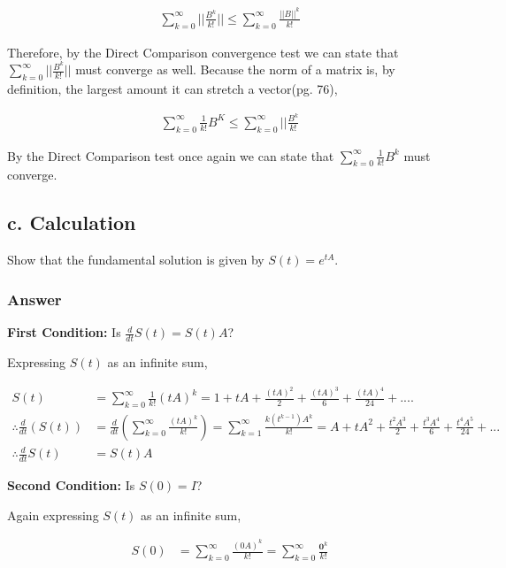 \documentclass{article}
\newcommand{\n}{\newline}
\begin{document}
		\begin{align*}
			\sum_{k=0}^{\infty}||\frac{B^k}{k!}||\leq\sum_{k=0}^{\infty}\frac{||B||^k}{k!}
		\end{align*} 
		
		Therefore, by the Direct Comparison convergence test\cite{ComTest} we can state that $\sum_{k=0}^{\infty}||\frac{B^k}{k!}||$ must converge as well.  Because the norm of a matrix is, by definition, the largest amount it can stretch a vector\cite{BG}(pg. 76), 
		
		\begin{align*}
			\sum_{k=0}^{\infty}\frac{1}{k!}B^{K}\leq\sum_{k=0}^{\infty}||\frac{B^k}{k!}
		\end{align*}
		
		By the Direct Comparison test once again we can state that $\sum_{k=0}^{\infty}\frac{1}{k!}B^{k}$ must converge.
		
		\subsection{c. Calculation}
		Show that the fundamental solution is given by $S(t)=e^{tA}$.
		\subsubsection{Answer}
		
		\textbf{First Condition:} Is $\frac{d}{dt}S(t)=S(t)A$?\n
		
		Expressing $S(t)$ as an infinite sum,
		
		\begin{align*}
			S(t)&=\sum_{k=0}^{\infty}\frac{1}{k!}(tA)^{k}=1+tA+\frac{(tA)^2}{2}+\frac{(tA)^3}{6}+\frac{(tA)^4}{24}+.... \\
			\therefore \frac{d}{dt}(S(t))&=\frac{d}{dt}(\sum_{k=0}^{\infty}\frac{(tA)^{k}}{k!})=\sum_{k=1}^{\infty}\frac{k(t^{k-1})A^k}{k!}=A+tA^2+\frac{t^2A^3}{2}+\frac{t^3A^4}{6}+\frac{t^4A^5}{24}+...\\
			\therefore \frac{d}{dt}S(t)&=S(t)A
		\end{align*}
		
		\textbf{Second Condition:} Is $S(0)=I$?\n
		
		Again expressing $S(t)$ as an infinite sum,
		
		\begin{align*}
			S(0)&=\sum_{k=0}^{\infty}\frac{(0A)^k}{k!}=\sum_{k=0}^{\infty}\frac{\mathbf{0}^k}{k!}
		\end{align*}
		
\end{document}
